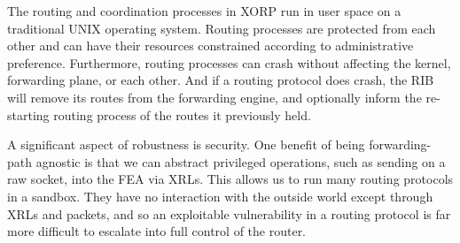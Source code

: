 The routing and coordination processes in XORP run in user space on a
traditional UNIX operating system.  Routing processes are protected
from each other and can have their resources constrained according to
administrative preference.  Furthermore, routing processes can crash
without affecting the kernel, forwarding plane, or each other.  And if
a routing protocol does crash, the RIB will remove its routes
from the forwarding engine, and optionally inform the re-starting
routing process of the routes it previously held.


A significant aspect of robustness is security.  One benefit of
being forwarding-path agnostic is that we can abstract
privileged operations, such as sending on a raw socket, into
the FEA via XRLs.  This allows us to run many routing protocols
in a sandbox. They have no interaction with the outside world except
through XRLs and packets, and so an exploitable vulnerability in a routing
protocol is far more difficult to escalate into full control of the
router.


